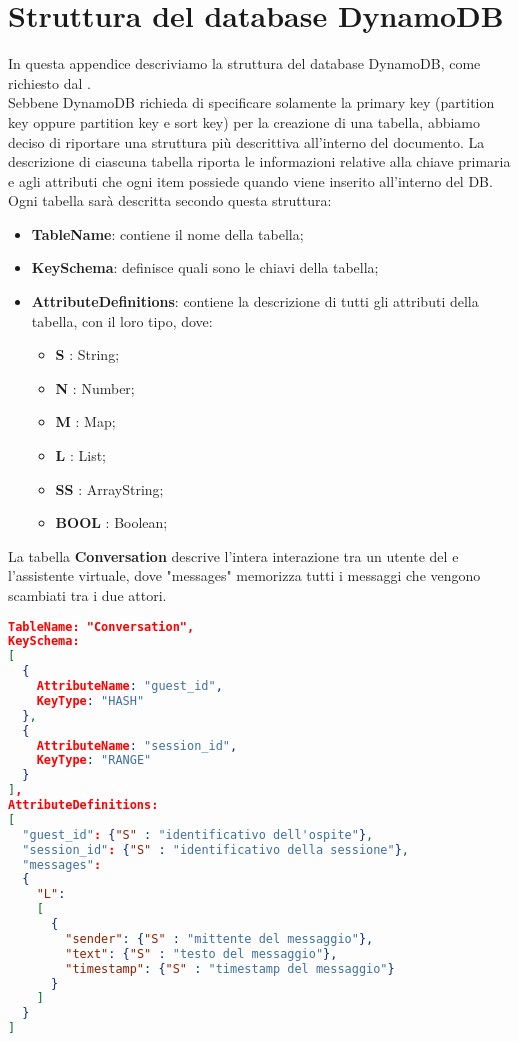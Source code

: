 \section{Struttura del database DynamoDB}
In questa appendice descriviamo la struttura del database DynamoDB, come richiesto dal  \PROPONENTE. \\
Sebbene DynamoDB richieda di specificare solamente la primary key (partition key oppure partition key e sort key) per la creazione di una tabella, abbiamo deciso di riportare una struttura più descrittiva all'interno del documento. La descrizione di ciascuna tabella riporta le informazioni relative alla chiave primaria e agli attributi che ogni item possiede quando viene inserito all'interno del DB.
Ogni tabella sarà descritta secondo questa struttura:
\begin{itemize}
 \item \textbf{TableName}: contiene il nome della tabella;
 \item \textbf{KeySchema}: definisce quali sono le chiavi della tabella;
 \item \textbf{AttributeDefinitions}: contiene la descrizione di tutti gli attributi della tabella, con il loro tipo, dove:
 \begin{itemize}
  \item \textbf{S} : String;
  \item \textbf{N} : Number;
  \item \textbf{M} : Map;
  \item \textbf{L} : List;
  \item \textbf{SS} : ArrayString;
  \item \textbf{BOOL} : Boolean;
 \end{itemize}
\end{itemize}
La tabella \textbf{Conversation} descrive l'intera interazione tra un utente del  e l'assistente virtuale, dove "messages" memorizza tutti i messaggi che vengono scambiati tra i due attori.
\begin{lstlisting}[language=json,firstnumber=1]
TableName: "Conversation",
KeySchema:
[
  {
    AttributeName: "guest_id",
    KeyType: "HASH"
  },
  {
    AttributeName: "session_id",
    KeyType: "RANGE"
  }
],
AttributeDefinitions:
[
  "guest_id": {"S" : "identificativo dell'ospite"},
  "session_id": {"S" : "identificativo della sessione"},
  "messages":
  {
    "L":
    [
      {
        "sender": {"S" : "mittente del messaggio"},
        "text": {"S" : "testo del messaggio"},
        "timestamp": {"S" : "timestamp del messaggio"}
      }
    ]
  }
]
\end{lstlisting}
